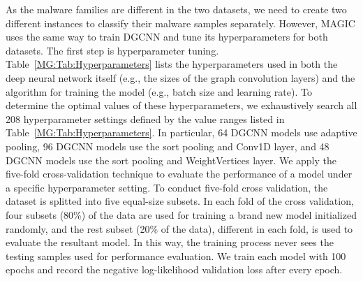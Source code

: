 As the malware families are different in the two datasets, we need to create two different \sysname instances to classify their malware samples separately. However, MAGIC uses the same way to train DGCNN and tune its hyperparameters for both datasets.
The first step is hyperparameter tuning.
Table~\ref{MG:Tab:Hyperparameters} lists the hyperparameters used in both the deep neural network itself (e.g., the sizes of the graph convolution layers) and the algorithm for training the model (e.g., batch size and learning rate).
To determine the optimal values of these hyperparameters,
we exhaustively search all 208 hyperparameter settings defined by the value ranges listed in Table~\ref{MG:Tab:Hyperparameters}.
In particular, 64 DGCNN models use adaptive pooling, 96 DGCNN models use the sort pooling and Conv1D layer, and 48 DGCNN models use the sort pooling and WeightVertices layer.
We apply the five-fold cross-validation technique to evaluate the performance of a model under a specific hyperparameter setting.
To conduct five-fold cross validation, the dataset is splitted into five equal-size subsets.
In each fold of the cross validation, four subsets (80\%) of the data are used for training a brand new model initialized randomly,
and the rest subset (20\% of the data), different in each fold, is used to evaluate the resultant model.
In this way, the training process never sees the testing samples used for performance evaluation.
We train each model with 100 epochs and record the negative log-likelihood validation loss after every epoch.


